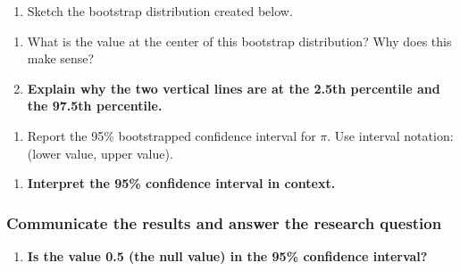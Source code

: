 \documentclass[
]{report}
\providecommand{\tightlist}{%
  \setlength{\itemsep}{0pt}\setlength{\parskip}{0pt}}
\begin{document}
\newpage

\begin{enumerate}
\def\labelenumi{\arabic{enumi}.}
\setcounter{enumi}{5}
\tightlist
\item
  Sketch the bootstrap distribution created below.
\end{enumerate}

\vspace{1.8in}

\begin{enumerate}
\def\labelenumi{\arabic{enumi}.}
\setcounter{enumi}{6}
\item
  What is the value at the center of this bootstrap distribution? Why does this make sense?
  \vspace{.8in}
\item
  \textbf{Explain why the two vertical lines are at the 2.5th percentile and the 97.5th percentile.}
\end{enumerate}

\vspace{.7in}

\begin{enumerate}
\def\labelenumi{\arabic{enumi}.}
\setcounter{enumi}{8}
\tightlist
\item
  Report the 95\% bootstrapped confidence interval for \(\pi\). Use interval notation: (lower value, upper value).
\end{enumerate}

\vspace{0.2in}

\begin{enumerate}
\def\labelenumi{\arabic{enumi}.}
\setcounter{enumi}{9}
\tightlist
\item
  \textbf{Interpret the 95\% confidence interval in context.}
\end{enumerate}

\vspace{.7in}

\hypertarget{communicate-the-results-and-answer-the-research-question-1}{%
\subsubsection*{Communicate the results and answer the research question}\label{communicate-the-results-and-answer-the-research-question-1}}

\begin{enumerate}
\def\labelenumi{\arabic{enumi}.}
\setcounter{enumi}{10}
\tightlist
\item
  \textbf{Is the value 0.5 (the null value) in the 95\% confidence interval?}
\end{enumerate}
\end{document}
